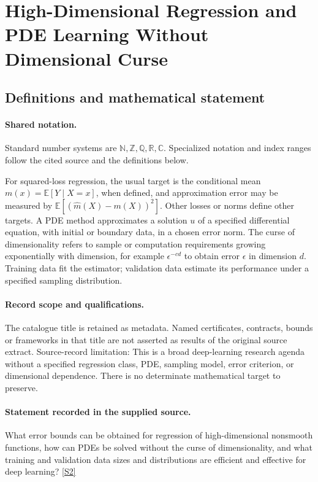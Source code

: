 \documentclass[11pt]{article}
\newcommand{\sref}[2]{\hyperlink{source:#1:#2}{[S#2]}}
\begin{document}
\section{High-Dimensional Regression and PDE Learning Without Dimensional Curse}\label{statement}

\subsection{Definitions and mathematical statement}

\paragraph{Shared notation.}Standard number systems are $\mathbb N,\mathbb Z,\mathbb Q,\mathbb R,\mathbb C$. Specialized notation and index ranges follow the cited source and the definitions below.


For squared-loss regression, the usual target is the conditional mean $m(x)=\mathbb E[Y\mid X=x]$, when defined, and approximation error may be measured by $\mathbb E[(\widehat m(X)-m(X))^2]$. Other losses or norms define other targets. A PDE method approximates a solution $u$ of a specified differential equation, with initial or boundary data, in a chosen error norm. The curse of dimensionality refers to sample or computation requirements growing exponentially with dimension, for example $\epsilon^{-c d}$ to obtain error $\epsilon$ in dimension $d$. Training data fit the estimator; validation data estimate its performance under a specified sampling distribution.
\paragraph{Record scope and qualifications.}
The catalogue title is retained as metadata. Named certificates, contracts, bounds or frameworks in that title are not asserted as results of the original source extract.
Source-record limitation: This is a broad deep-learning research agenda without a specified regression class, PDE, sampling model, error criterion, or dimensional dependence. There is no determinate mathematical target to preserve.
\paragraph{Statement recorded in the supplied source.}
What error bounds can be obtained for regression of high-dimensional nonsmooth functions, how can PDEs be solved without the curse of dimensionality, and what training and validation data sizes and distributions are efficient and effective for deep learning? \sref{statement}{2}
\end{document}
